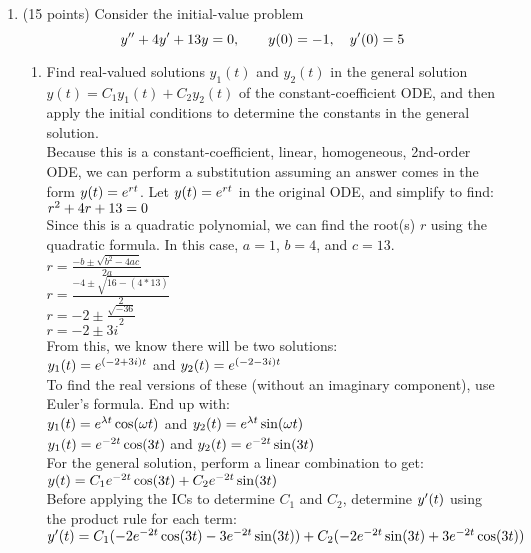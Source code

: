 \documentclass{article}
\begin{document}
\begin{enumerate}
\begin{enumerate}
\end{enumerate}

\item (15 points)  Consider the initial-value problem
\[
y\sp{\prime\prime}+4y\sp\prime+13y=0,\qquad y(0)=-1,\quad y\sp\prime(0)=5
\]
\begin{enumerate}
\item Find real-valued solutions $y_1(t)$ and $y_2(t)$ in the general solution $y(t)=C_1y_1(t)+C_2y_2(t)$ of the constant-coefficient ODE, and then apply the initial conditions to determine the constants in the general solution.\\

Because this is a constant-coefficient, linear, homogeneous, 2nd-order ODE, we can perform a substitution assuming an answer comes in the form $y(t)=e\sp{rt}$. Let $y(t)=e\sp{rt}$ in the original ODE, and simplify to find:\\

$r\sp{2}+4r+13=0$\\
Since this is a quadratic polynomial, we can find the root(s) $r$ using the quadratic formula. In this case, $a=1$, $b=4$, and $c=13$.\\
$r=\frac{-b\pm\sqrt{b^2-4ac}}{2a}$\\
$r=\frac{-4\pm\sqrt{16-(4*13)}}{2}$\\
$r=-2\pm\frac{\sqrt{-36}}{2}$\\
$r=-2\pm3i$\\

From this, we know there will be two solutions:\\
$y_1(t) = e\sp{(-2+3i)t}$ and $y_2(t) = e\sp{(-2-3i)t}$\\
To find the real versions of these (without an imaginary component), use Euler's formula. End up with:\\
$y_1(t) = e\sp{\lambda t}\cos(\omega t)$ and $y_2(t) = e\sp{\lambda t}\sin(\omega t)$\\
$y_1(t) = e\sp{-2t}\cos(3t)$ and $y_2(t) = e\sp{-2t}\sin(3t)$\\

For the general solution, perform a linear combination to get:\\
$y(t) = C_{1}e\sp{-2t}\cos(3t) + C_{2}e\sp{-2t}\sin(3t)$\\
Before applying the ICs to determine $C_1$ and $C_2$, determine $y\sp\prime(t)$ using the product rule for each term:\\
$y\sp\prime(t) = C_{1}(-2e\sp{-2t}\cos(3t) - 3e\sp{-2t}\sin(3t))+ C_{2}(-2e\sp{-2t}\sin(3t) + 3e\sp{-2t}\cos(3t))$\\


\end{enumerate}
\end{enumerate}
\end{document}
